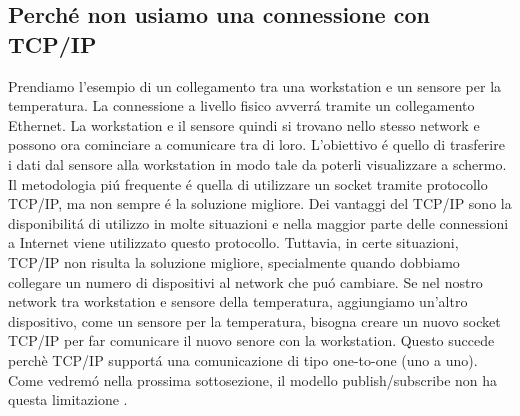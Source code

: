\subsection{Perché non usiamo una connessione con TCP/IP}
Prendiamo l'esempio di un collegamento tra una workstation e 
un sensore per la temperatura. La connessione a livello fisico
avverrá tramite un collegamento Ethernet. La workstation e il 
sensore quindi si trovano nello stesso network e possono 
ora cominciare a comunicare tra di loro. L'obiettivo é quello
di trasferire i dati dal sensore alla workstation in modo tale
da poterli visualizzare a schermo.
Il metodologia piú frequente é quella di utilizzare un socket tramite 
protocollo TCP/IP, ma non sempre é la soluzione migliore.
Dei vantaggi del TCP/IP sono la disponibilitá di utilizzo 
in molte situazioni e nella maggior parte delle connessioni a 
Internet viene utilizzato questo protocollo.
Tuttavia, in certe situazioni, TCP/IP non risulta la soluzione migliore,
specialmente quando dobbiamo collegare un numero di dispositivi al 
network che puó cambiare. Se nel nostro network tra workstation e 
sensore della temperatura, aggiungiamo un'altro dispositivo, come un 
sensore per la temperatura, bisogna creare un nuovo socket 
TCP/IP per far comunicare il nuovo senore con la workstation.
Questo succede perchè TCP/IP supportá una comunicazione di tipo 
one-to-one (uno a uno). Come vedremó nella prossima sottosezione,
il modello publish/subscribe non ha questa limitazione \cite{1494965}.

